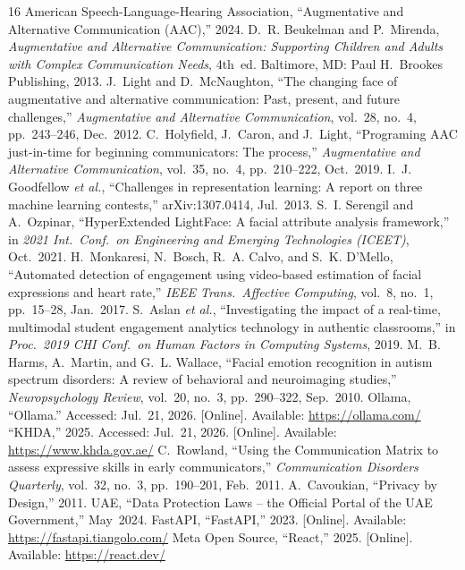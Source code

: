 \documentclass[conference]{IEEEtran}
\begin{document}
\balance
\begin{thebibliography}{16}
 American Speech-Language-Hearing Association, ``Augmentative and Alternative Communication (AAC),'' 2024.
 D.~R. Beukelman and P.~Mirenda, \emph{Augmentative and Alternative Communication: Supporting Children and Adults with Complex Communication Needs}, 4th~ed. Baltimore, MD: Paul H.\ Brookes Publishing, 2013.
 J.~Light and D.~McNaughton, ``The changing face of augmentative and alternative communication: Past, present, and future challenges,'' \emph{Augmentative and Alternative Communication}, vol.~28, no.~4, pp.~243--246, Dec.~2012.
 C.~Holyfield, J.~Caron, and J.~Light, ``Programing AAC just-in-time for beginning communicators: The process,'' \emph{Augmentative and Alternative Communication}, vol.~35, no.~4, pp.~210--222, Oct.~2019.
 I.~J. Goodfellow \emph{et al.}, ``Challenges in representation learning: A report on three machine learning contests,'' arXiv:1307.0414, Jul.~2013.
 S.~I. Serengil and A.~Ozpinar, ``HyperExtended LightFace: A facial attribute analysis framework,'' in \emph{2021 Int.\ Conf.\ on Engineering and Emerging Technologies (ICEET)}, Oct.~2021.
 H.~Monkaresi, N.~Bosch, R.~A. Calvo, and S.~K. D'Mello, ``Automated detection of engagement using video-based estimation of facial expressions and heart rate,'' \emph{IEEE Trans.\ Affective Computing}, vol.~8, no.~1, pp.~15--28, Jan.~2017.
 S.~Aslan \emph{et al.}, ``Investigating the impact of a real-time, multimodal student engagement analytics technology in authentic classrooms,'' in \emph{Proc.\ 2019 CHI Conf.\ on Human Factors in Computing Systems}, 2019.
 M.~B. Harms, A.~Martin, and G.~L. Wallace, ``Facial emotion recognition in autism spectrum disorders: A review of behavioral and neuroimaging studies,'' \emph{Neuropsychology Review}, vol.~20, no.~3, pp.~290--322, Sep.~2010.
 Ollama, ``Ollama.'' Accessed: Jul.~21, 2026. [Online]. Available: \url{https://ollama.com/}
 ``KHDA,'' 2025. Accessed: Jul.~21, 2026. [Online]. Available: \url{https://www.khda.gov.ae/}
 C.~Rowland, ``Using the Communication Matrix to assess expressive skills in early communicators,'' \emph{Communication Disorders Quarterly}, vol.~32, no.~3, pp.~190--201, Feb.~2011.
 A.~Cavoukian, ``Privacy by Design,'' 2011.
 UAE, ``Data Protection Laws -- the Official Portal of the UAE Government,'' May~2024.
 FastAPI, ``FastAPI,'' 2023. [Online]. Available: \url{https://fastapi.tiangolo.com/}
 Meta Open Source, ``React,'' 2025. [Online]. Available: \url{https://react.dev/}
\end{thebibliography}
\end{document}

